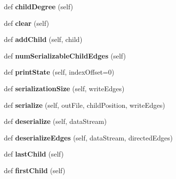 \begin{DoxyCompactItemize}
def {\bfseries child\+Degree} (self)
\item 
\mbox{\label{classinfomap_1_1ChildIterator_a0debf73c8ea3a793e35779623d1864d0}} 
def {\bfseries clear} (self)
\item 
\mbox{\label{classinfomap_1_1ChildIterator_a41b92e34d5491db415fb5ff25e4aa4ce}} 
def {\bfseries add\+Child} (self, child)
\item 
\mbox{\label{classinfomap_1_1ChildIterator_ae25c8b360d2ea9a9ceeb130807d6407e}} 
def {\bfseries num\+Serializable\+Child\+Edges} (self)
\item 
\mbox{\label{classinfomap_1_1ChildIterator_a30029c7a810ec6654d523dfa091e3b85}} 
def {\bfseries print\+State} (self, index\+Offset=0)
\item 
\mbox{\label{classinfomap_1_1ChildIterator_ab5a53977f4f59569479b2e4b88170b18}} 
def {\bfseries serialization\+Size} (self, write\+Edges)
\item 
\mbox{\label{classinfomap_1_1ChildIterator_a016b2844ca87861f801d36b948c51d73}} 
def {\bfseries serialize} (self, out\+File, child\+Position, write\+Edges)
\item 
\mbox{\label{classinfomap_1_1ChildIterator_ac25539d16cbdab9fd0df9d98d0813ef3}} 
def {\bfseries deserialize} (self, data\+Stream)
\item 
\mbox{\label{classinfomap_1_1ChildIterator_ae4c1de9c0693d1429568405a0966da20}} 
def {\bfseries deserialize\+Edges} (self, data\+Stream, directed\+Edges)
\item 
\mbox{\label{classinfomap_1_1ChildIterator_a59e4b8f3d074955abf5b3d7d37e5ed65}} 
def {\bfseries last\+Child} (self)
\item 
\mbox{\label{classinfomap_1_1ChildIterator_a91d6f4ab57d39ae5980894176c5d19fd}} 
def {\bfseries first\+Child} (self)
\item 

\end{DoxyCompactItemize}
